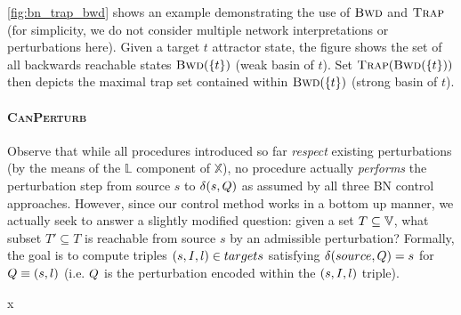 \autoref{fig:bn_trap_bwd} shows an example demonstrating the use of $\textsc{Bwd}$ and $\textsc{Trap}$ (for simplicity, we do not consider multiple network interpretations or perturbations here). Given a target $t$ attractor state, the figure shows the set of all backwards reachable states $\textsc{Bwd}(\{t\})$ (weak basin of $t$). Set $\textsc{Trap}(\textsc{Bwd}(\{t\}))$ then depicts the maximal trap set contained within $\textsc{Bwd}(\{t\})$ (strong basin of $t$).

\paragraph{\textsc{CanPerturb}} %
Observe that while all procedures introduced so far \emph{respect} existing perturbations (by the means of the $\mathbb{L}$ component of $\mathbb{X}$), no procedure actually \emph{performs} the perturbation step from source $s$ to $\delta(s, Q)$ as assumed by all three BN control approaches. However, since our control method works in a bottom up manner, we actually seek to answer a slightly modified question: given a set $T \subseteq \mathbb{V}$, what subset $T' \subseteq T$ is reachable from source $s$ by an admissible perturbation? Formally, the goal is to compute triples $(s, I, l) \in targets$ satisfying $\delta(source, Q) = s$ for $Q \equiv (s, l)$ (i.e. $Q$ is the perturbation encoded within the $(s, I, l)$ triple).

\begin{algorithm}
	\caption{Basic graph algorithms.}
	\label{algo:sb}x
\end{algorithm}    


